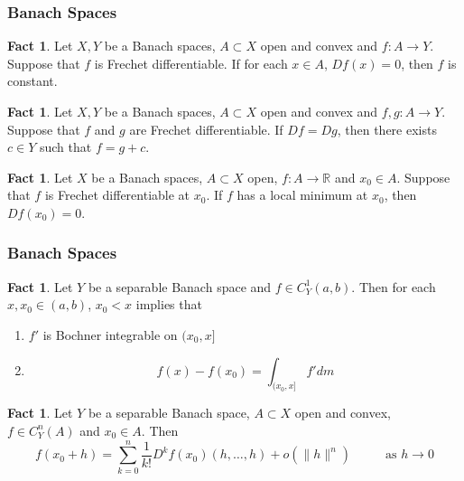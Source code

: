 \documentclass[notheorems]{beamer}
\theoremstyle{definition}
\newtheorem{fact}[definition]{Fact}
\newcommand{\R}{\mathbb{R}}
\begin{document}
\begin{frame}
\frametitle{Banach Spaces}

\begin{fact}
Let $X, Y$ be a Banach spaces, $A \subset X$ open and convex and $f:A \rightarrow Y$. Suppose that $f$ is Frechet differentiable. If for each $x \in A$, $Df(x) = 0$, then $f$ is constant.
\end{fact}
\pause

\begin{fact}
Let $X, Y$ be a Banach spaces, $A \subset X$ open and convex and $f,g:A \rightarrow Y$. Suppose that $f$ and $g$ are Frechet differentiable. If $Df = Dg$, then there exists $c \in Y$ such that $f = g+c$.
\end{fact}
\pause

\begin{fact}
Let $X$ be a Banach spaces, $A \subset X$ open, $f:A \rightarrow \R$ and $x_0 \in A$. Suppose that $f$ is Frechet differentiable at $x_0$. If $f$ has a local minimum at $x_0$, then $Df(x_0) = 0$. 
\end{fact}
\end{frame}












\begin{frame}
\frametitle{Banach Spaces}

\begin{fact}
Let $Y$ be a separable Banach space and $f \in C^1_Y(a,b)$. Then for each $x, x_0 \in (a,b)$, $x_0 < x$ implies that 
	\begin{enumerate}
	\item $f'$ is Bochner integrable on $(x_0, x]$ 
	\item  $$f(x) - f(x_0) = \int_{(x_0, x]}f'dm$$ 
	\end{enumerate}
\end{fact}
\pause

\begin{fact}
Let $Y$ be a separable Banach space, $A \subset X$ open and convex, $f\in C^n_Y(A)$ and $x_0 \in A$. Then $$f(x_0 + h) = \sum_{k=0}^n \frac{1}{k!} D^k f(x_0)(h, \dots, h) + o(\|h\|^n) \hspace{1cm }\text{ as } h \rightarrow 0$$
\end{fact}
\end{frame}
\end{document}
